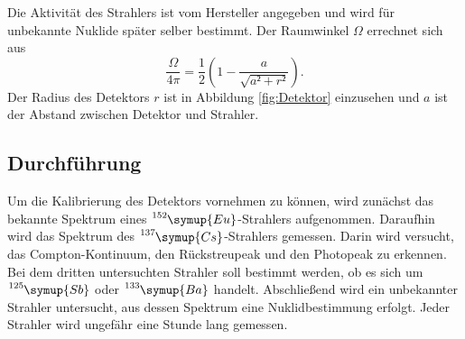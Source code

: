 Die Aktivität des Strahlers ist vom Hersteller angegeben und wird für unbekannte Nuklide später selber bestimmt.
Der Raumwinkel $\Omega$ errechnet sich aus
\begin{equation}
\label{eqn:raum}
\frac{\Omega}{4\pi}=\frac12\left(1-\frac a{\sqrt{a²+r²}}\right).
\end{equation}
Der Radius des Detektors $r$ ist in Abbildung \ref{fig:Detektor} einzusehen und $a$ ist der Abstand zwischen Detektor und Strahler.
\subsection{Durchführung}
Um die Kalibrierung des Detektors vornehmen zu können, wird zunächst das bekannte Spektrum eines $\ce{^{152}}\symup{Eu}$-Strahlers aufgenommen.
Daraufhin wird das Spektrum des $\ce{^{137}}\symup{Cs}$-Strahlers gemessen.
Darin wird versucht, das Compton-Kontinuum, den Rückstreupeak und den Photopeak zu erkennen.
Bei dem dritten untersuchten Strahler soll bestimmt werden, ob es sich um $\ce{^{125}}\symup{Sb}$ oder $\ce{^{133}}\symup{Ba}$ handelt.
Abschließend wird ein unbekannter Strahler untersucht, aus dessen Spektrum eine Nuklidbestimmung erfolgt.
Jeder Strahler wird ungefähr eine Stunde lang gemessen.